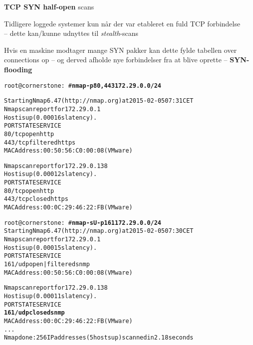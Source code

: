 \documentclass[Screen16to9,17pt]{foils}
\begin{document}


\begin{list2}
\item {\bfseries TCP SYN half-open} scans
\item Tidligere loggede systemer kun når der var etableret en fuld TCP
  forbindelse\\
  -- dette kan/kunne udnyttes til \emph{stealth}-scans
\item Hvis en maskine modtager mange SYN pakker kan dette fylde
  tabellen over connections op -- og derved afholde nye forbindelser
  fra at blive oprette -- {\bfseries SYN-flooding}
\end{list2}



\begin{alltt}\small
root@cornerstone:~#{\bfseries  nmap -p80,443 172.29.0.0/24}

Starting Nmap 6.47 ( http://nmap.org ) at 2015-02-05 07:31 CET
Nmap scan report for 172.29.0.1
Host is up (0.00016s latency).
PORT    STATE    SERVICE
{\color{darkgreen}80/tcp  open     http}
443/tcp filtered https
MAC Address: 00:50:56:C0:00:08 (VMware)

Nmap scan report for 172.29.0.138
Host is up (0.00012s latency).
PORT    STATE  SERVICE
{\color{darkgreen}80/tcp  open   http}
443/tcp closed https
MAC Address: 00:0C:29:46:22:FB (VMware)

\end{alltt}


\begin{alltt}\small
root@cornerstone:~#{\bfseries nmap -sU -p 161 172.29.0.0/24}
Starting Nmap 6.47 ( http://nmap.org ) at 2015-02-05 07:30 CET
Nmap scan report for 172.29.0.1
Host is up (0.00015s latency).
PORT    STATE         SERVICE
{\color{darkgreen}161/udp open|filtered snmp}
MAC Address: 00:50:56:C0:00:08 (VMware)

Nmap scan report for 172.29.0.138
Host is up (0.00011s latency).
PORT    STATE  SERVICE
{\bf{161/udp closed snmp}}
MAC Address: 00:0C:29:46:22:FB (VMware)
...
Nmap done: 256 IP addresses (5 hosts up) scanned in 2.18 seconds
\end{alltt}
\end{document}
